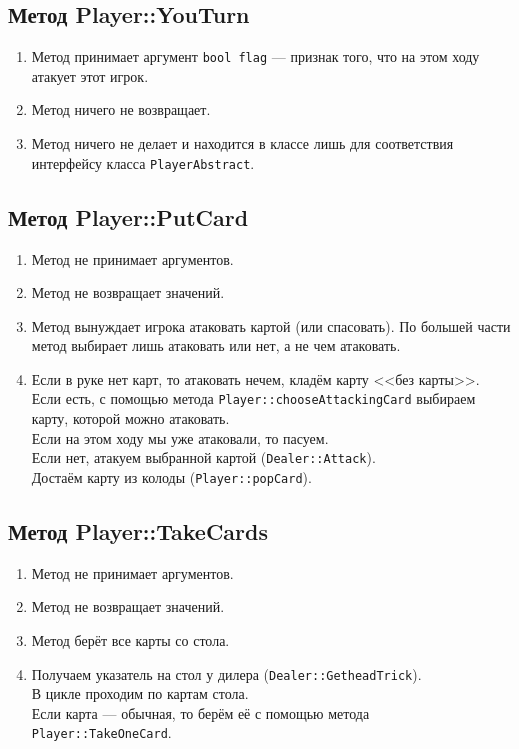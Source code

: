 \documentclass[a4paper,12pt]{article}
\begin{document}
        \subsection {Метод Player::YouTurn}
			\begin{enumerate}
				\item 	Метод принимает аргумент \texttt{bool flag} --- признак того, что на этом ходу атакует этот игрок.
				\item 	Метод ничего не возвращает.
				\item 	Метод ничего не делает и находится в классе лишь для соответствия интерфейсу класса \texttt{PlayerAbstract}.
			\end{enumerate}

		\subsection {Метод Player::PutCard} %
			\begin{enumerate}
				\item 	Метод не принимает аргументов.
				\item 	Метод не возвращает значений.
				\item 	Метод вынуждает игрока атаковать картой (или спасовать).
						По большей части метод выбирает лишь атаковать или нет, а не чем атаковать.
				\item 	Если в руке нет карт, то атаковать нечем, кладём карту <<без карты>>.\\
						Если есть, с помощью метода \texttt{Player::chooseAttackingCard} выбираем карту, которой можно атаковать.\\
						Если на этом ходу мы уже атаковали, то пасуем.\\
						Если нет, атакуем выбранной картой (\texttt{Dealer::Attack}).\\
						Достаём карту из колоды (\texttt{Player::popCard}).
			\end{enumerate}

		\subsection {Метод Player::TakeCards} %
			\begin{enumerate}
				\item 	Метод не принимает аргументов.
				\item 	Метод не возвращает значений.
				\item 	Метод берёт все карты со стола.
				\item 	Получаем указатель на стол у дилера (\texttt{Dealer::GetheadTrick}).\\
						В цикле проходим по картам стола.\\
						Если карта --- обычная, то берём её с помощью метода \texttt{Player::TakeOneCard}.
			\end{enumerate}
\end{document}
